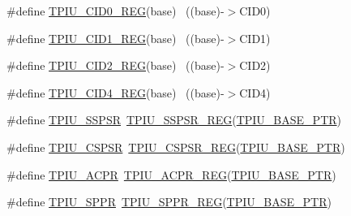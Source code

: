 \begin{DoxyCompactItemize}
\item 
\#define \hyperlink{group___t_p_i_u___register___accessor___macros_gae0f119eaf4617470a270da91ce27f9fb}{T\+P\+I\+U\+\_\+\+C\+I\+D0\+\_\+\+R\+EG}(base)                                        ~((base)-\/$>$C\+I\+D0)
\item 
\#define \hyperlink{group___t_p_i_u___register___accessor___macros_ga3b9d84f25d7269b36d2c74fa5420450c}{T\+P\+I\+U\+\_\+\+C\+I\+D1\+\_\+\+R\+EG}(base)                                        ~((base)-\/$>$C\+I\+D1)
\item 
\#define \hyperlink{group___t_p_i_u___register___accessor___macros_ga5a60a1d412839185c0398f0b29153430}{T\+P\+I\+U\+\_\+\+C\+I\+D2\+\_\+\+R\+EG}(base)                                        ~((base)-\/$>$C\+I\+D2)
\item 
\#define \hyperlink{group___t_p_i_u___register___accessor___macros_ga887058c50d4ad4cfce8fefc4275e9dc2}{T\+P\+I\+U\+\_\+\+C\+I\+D4\+\_\+\+R\+EG}(base)                                        ~((base)-\/$>$C\+I\+D4)
\item 
\#define \hyperlink{group___t_p_i_u___register___accessor___macros_gafe9850f6644e019acbd41ae36f2a9bb8}{T\+P\+I\+U\+\_\+\+S\+S\+P\+SR}~\hyperlink{group___t_p_i_u___register___accessor___macros_ga70f7b58922eb91eec6196998a950e7e6}{T\+P\+I\+U\+\_\+\+S\+S\+P\+S\+R\+\_\+\+R\+EG}(\hyperlink{group___t_p_i_u___peripheral_ga9294dc3ec1881014ac83408db60de6a0}{T\+P\+I\+U\+\_\+\+B\+A\+S\+E\+\_\+\+P\+TR})
\item 
\#define \hyperlink{group___t_p_i_u___register___accessor___macros_ga30ef8dde42bb8b5ce47fd60b3450b4ce}{T\+P\+I\+U\+\_\+\+C\+S\+P\+SR}~\hyperlink{group___t_p_i_u___register___accessor___macros_gafea47d54b3ce624f0b487095a33f87ee}{T\+P\+I\+U\+\_\+\+C\+S\+P\+S\+R\+\_\+\+R\+EG}(\hyperlink{group___t_p_i_u___peripheral_ga9294dc3ec1881014ac83408db60de6a0}{T\+P\+I\+U\+\_\+\+B\+A\+S\+E\+\_\+\+P\+TR})
\item 
\#define \hyperlink{group___t_p_i_u___register___accessor___macros_ga5b928b2763dbc7685675954dfbc77b5e}{T\+P\+I\+U\+\_\+\+A\+C\+PR}~\hyperlink{group___t_p_i_u___register___accessor___macros_gaa1533cc1963e2e41268410ac18591036}{T\+P\+I\+U\+\_\+\+A\+C\+P\+R\+\_\+\+R\+EG}(\hyperlink{group___t_p_i_u___peripheral_ga9294dc3ec1881014ac83408db60de6a0}{T\+P\+I\+U\+\_\+\+B\+A\+S\+E\+\_\+\+P\+TR})
\item 
\#define \hyperlink{group___t_p_i_u___register___accessor___macros_ga07413fb90b689fafae5fb669e7bfadd7}{T\+P\+I\+U\+\_\+\+S\+P\+PR}~\hyperlink{group___t_p_i_u___register___accessor___macros_ga0999ff94c91a95cc02e2bbd25f41f2b4}{T\+P\+I\+U\+\_\+\+S\+P\+P\+R\+\_\+\+R\+EG}(\hyperlink{group___t_p_i_u___peripheral_ga9294dc3ec1881014ac83408db60de6a0}{T\+P\+I\+U\+\_\+\+B\+A\+S\+E\+\_\+\+P\+TR})

\end{DoxyCompactItemize}
